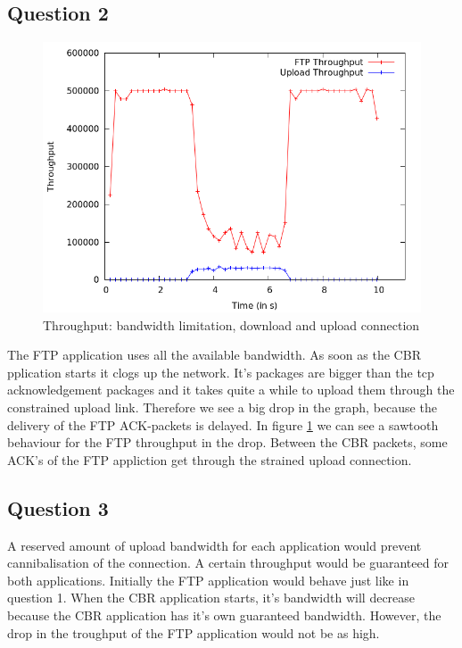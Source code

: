 \documentclass[11pt,a4paper]{article}
\begin{document}
\subsection{Question 2}
\begin{figure}[h!]
 \centering
 \includegraphics[width = 0.8\linewidth]{./output-ex1-part-2-1-7.png}
  \caption{Throughput: bandwidth limitation, download and upload connection}
 \label{fig:Q2}
\end{figure}
The FTP application uses all the available bandwidth. As soon as the CBR pplication starts it clogs up the network. It's packages are bigger than the tcp acknowledgement packages and it takes quite a while to upload them through the constrained upload link. Therefore we see a big drop in the graph, because the delivery of the FTP ACK-packets is delayed. In figure \ref{fig:Q2} we can see a sawtooth behaviour for the FTP throughput in the drop. Between the CBR packets, some ACK's of the FTP appliction get through the strained upload connection.

\subsection{Question 3}
A reserved amount of upload bandwidth for each application would prevent cannibalisation of the connection. A certain throughput would be guaranteed for both applications. Initially the FTP application would behave just like in question 1. When the CBR application starts, it's bandwidth will decrease because the CBR application has it's own guaranteed bandwidth. However, the drop in the troughput of the FTP application would not be as high.
\end{document}
